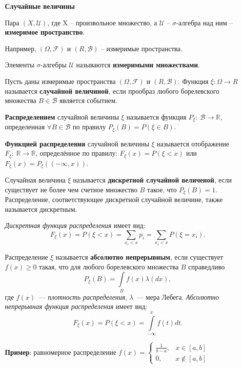 \centerline{\textbf{Случайные величины}}

Пара $(X, \mathcal{U})$, где X – произвольное множество, а $\mathcal{U}$ -- $\sigma$-алгебра над ним -- \textbf{измеримое пространство}. 

Например, $(\Omega, \mathcal{F})$ и $(R, \mathcal{B})$ -- измеримые пространства. 

Элементы  $\sigma$-алгебры $\mathcal{U}$ называются \textbf{измеримыми множествами}.

Пусть даны измеримые пространства $(\Omega, \mathcal{F})$ и $(R, \mathcal{B})$. Функция $\xi : \Omega \rightarrow R$ называется \textbf{случайной величиной}, если прообраз любого борелевского множества $B \in \mathcal{B}$ является событием.

\textbf{Распределением} случайной величины $\xi$ называется функция $P_{\xi}:~\mathcal{B} \rightarrow \mathbb{R}$, определенная $\forall B \in \mathcal{B}$ по правилу $P_{\xi}(B) = P(\xi \in B)$.

\textbf{Функцией распределения} случайной величины $\xi$ называется отображение $F_{\xi}:~\mathbb{R} \rightarrow \mathbb{R}$, определённое по правилу: $F_{\xi}(x) = P(\xi < x)$ или $F_{\xi}(x) = P_{\xi}((-\infty, x))$.

Случайная величина $\xi$ называется \textbf{дискретной случайной величеной}, если существует не более чем счетное множество $B$ такое, что $P_{\xi}(B) = 1$. Распределение, соответствующее дискретной случайной величине, также называется дискретным.

\textit{Дискретная функция распределения} имеет вид:
    \begin{equation*}
        F_\xi(x) = P(\xi < x) = \sum\limits_{x_i < x}{}p_{i} = \sum\limits_{x_i < x}{} P(\xi = x_{i}).
    \end{equation*}


Распределение $\xi$ называется \textbf{абсолютно непрерывным}, если существует
$f(x) \geqslant 0$ такая, что для любого борелевского множества $B$ справедливо
\begin{equation*}
    P_\xi(B) = \int\limits_B f(x) \lambda(dx),
\end{equation*}
где $f(x)$~--- \textit{плотность распределения}, $\lambda$~--- мера Лебега. 
\textit{Абсолютно непрерывная функция распределения} имеет вид:
\begin{equation*}
    F_\xi(x) = P(\xi < x) = \int\limits_{-\infty}^x f(t)dt.
\end{equation*}


\textbf{Пример}: равномерное распределение
$f(x) = \begin{cases}\frac{1}{b - a},& x\in[a,b]\\ 0,& x\notin[a,b] \end{cases}$

